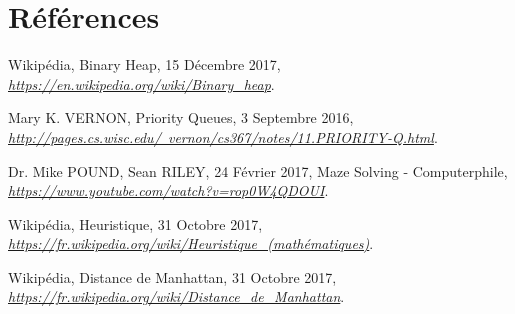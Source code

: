 \documentclass[10pt]{article}
\begin{document}
	\section{Références}
		\begin{thebibliography}{}

				Wikipédia, Binary Heap, 15 Décembre 2017,\newline
				\href{https://en.wikipedia.org/wiki/Binary\_heap}
				      {\textit{https://en.wikipedia.org/wiki/Binary\_heap}}.

				Mary K. VERNON, Priority Queues, 3 Septembre 2016,\newline
				\href{http://pages.cs.wisc.edu/~vernon/cs367/notes/11.PRIORITY-Q.html}
					{\textit{http://pages.cs.wisc.edu/~vernon/cs367/notes/11.PRIORITY-Q.html}}.
		
				Dr. Mike POUND, Sean RILEY, 24 Février 2017,\newline
				Maze Solving - Computerphile,\newline
				\href{https://www.youtube.com/watch?v=rop0W4QDOUI}{\textit{https://www.youtube.com/watch?v=rop0W4QDOUI}}.
			  
				Wikipédia, Heuristique, 31 Octobre 2017,\newline
				\href{https://fr.wikipedia.org/wiki/Heuristique_(mathématiques)}
				      {\textit{https://fr.wikipedia.org/wiki/Heuristique\_(mathématiques)}}.
				      
				Wikipédia, Distance de Manhattan, 31 Octobre 2017,\newline
				\href{https://fr.wikipedia.org/wiki/Distance_de_Manhattan}
				      {\textit{https://fr.wikipedia.org/wiki/Distance\_de\_Manhattan}}.

  \end{thebibliography}
\end{document}
